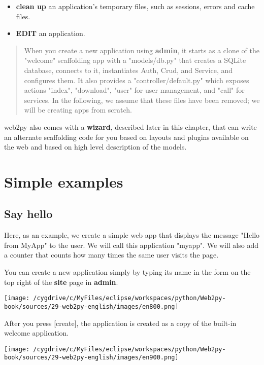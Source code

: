 \documentclass[justified,sixbynine,notoc]{tufte-book}
\def\inxx#1{\index{#1}}
\begin{document}
\begin{fullwidth}
\begin{itemize}
\item {\bf clean up} an application's temporary files, such as sessions, errors and cache files.

\item {\bf EDIT} an application.
\end{itemize}

\begin{quote}When you create a new application using {\bf admin}, it starts as a clone of the "welcome" scaffolding app with a "models/db.py" that creates a SQLite database, connects to it, instantiates Auth, Crud, and Service, and configures them. It also provides a "controller/default.py" which exposes actions "index", "download", "user" for user management, and "call" for services. In the following, we assume that these files have been removed; we will be creating apps from scratch.\end{quote}
web2py also comes with a {\bf wizard}, described later in this chapter, that can write an alternate scaffolding code for you based on layouts and plugins available on the web and based on high level description of the models.

\goodbreak\section{Simple examples}

\goodbreak\subsection{Say hello}

\inxx{index}

Here, as an example, we create a simple web app that displays the message "Hello from MyApp" to the user. We will call this application "myapp". We will also add a counter that counts how many times the same user visits the page.

You can create a new application simply by typing its name in the form on the top right of the {\bf site} page in {\bf admin}.


\goodbreak\begin{center}\texttt{[image: /cygdrive/c/MyFiles/eclipse/workspaces/python/Web2py-book/sources/29-web2py-english/images/en800.png]}\end{center}


After you press [create], the application is created as a copy of the built-in welcome application.


\goodbreak\begin{center}\texttt{[image: /cygdrive/c/MyFiles/eclipse/workspaces/python/Web2py-book/sources/29-web2py-english/images/en900.png]}\end{center}



\end{fullwidth}
\end{document}
